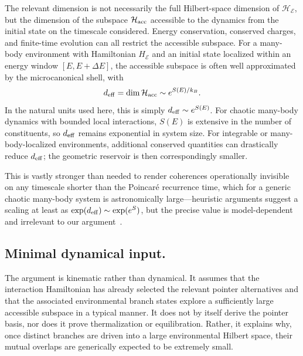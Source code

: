 \documentclass[aps,pra,reprint,superscriptaddress,nofootinbib,longbibliography]{revtex4-2}
\newcommand{\HH}{\mathcal{H}}
\newcommand{\EE}{\mathcal{E}}
\begin{document}
The relevant dimension is not necessarily the full Hilbert-space dimension of
$\HH_{\EE}$, but the dimension of the subspace $\HH_{\rm acc}$ accessible to
the dynamics from the initial state on the timescale considered. Energy
conservation, conserved charges, and finite-time evolution can all restrict the
accessible subspace. For a many-body environment with Hamiltonian $H_{\EE}$ and
an initial state localized within an energy window $[E,E+\Delta E]$, the
accessible subspace is often well approximated by the microcanonical shell,
with
\begin{equation}
    d_{\rm eff}=\dim\HH_{\rm acc}\sim e^{S(E)/k_B}.
    \label{eq:microcanonical-deff}
\end{equation}
In the natural units used here, this is simply $d_{\rm eff}\sim e^{S(E)}$.
For chaotic many-body dynamics with bounded local interactions, $S(E)$ is
extensive in the number of constituents, so $d_{\rm eff}$ remains exponential
in system size. For integrable or many-body-localized environments, additional
conserved quantities can drastically reduce $d_{\rm eff}$; the geometric
reservoir is then correspondingly smaller.

This is vastly stronger than needed to render coherences operationally invisible on any timescale shorter than the Poincar\'e recurrence time, which for a generic chaotic many-body system is astronomically large---heuristic arguments suggest a scaling at least as $\exp(d_{\rm eff})\sim\exp(e^{S})$, but the precise value is model-dependent and irrelevant to our argument~\cite{peres1982recurrence,wallace2015recurrence}.


\subsection*{Minimal dynamical input.}

The argument is kinematic rather than dynamical. It assumes that the interaction
Hamiltonian has already selected the relevant pointer alternatives and that the
associated environmental branch states explore a sufficiently large accessible
subspace in a typical manner. It does not by itself derive the pointer basis,
nor does it prove thermalization or equilibration. Rather, it explains why, once
distinct branches are driven into a large environmental Hilbert space, their
mutual overlaps are generically expected to be extremely small.
\end{document}
